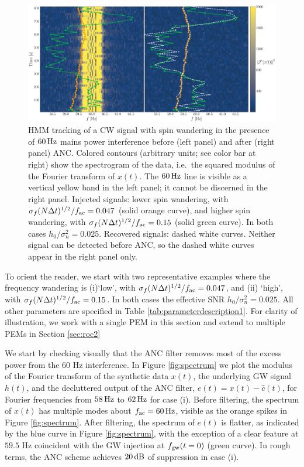 \documentclass[pra,superscriptaddress,reprint,amsmath,amssymb,nofootinbib]{revtex4-2}
\begin{document}
\begin{figure}
	\begin{center}
			\includegraphics[width=\textwidth]{images/viterbi_tracking_canonical}
		\end{center}
	\caption{\label{frequency tracking before and after1}
			HMM tracking of a CW signal with spin wandering in the presence of $60 \, {\rm Hz}$ mains power interference before (left panel) and after (right panel) ANC. Colored contours (arbitrary units; see color bar at right) show the spectrogram of the data, i.e.\ the squared modulus of the Fourier transform of $x(t)$. The $60 \, {\rm Hz}$ line is visible as a vertical yellow band in the left panel; it cannot be discerned in the right panel. Injected signals: lower spin wandering, with $\sigma_f (N \Delta t)^{1/2} / f_{\rm ac} = 0.047$ (solid orange curve), and higher spin wandering, with $\sigma_f (N \Delta t)^{1/2} / f_{\rm ac} = 0.15$ (solid green curve). In both cases $h_0 / \sigma_n^2 = 0.025$. Recovered signals: dashed white curves. Neither signal can be detected before ANC, so the dashed white curves appear in the right panel only.}
\end{figure}
To orient the reader, we start with two representative examples where the frequency wandering is  (i)`low', with $\sigma_f (N \Delta t)^{1/2} / f_{\rm ac} = 0.047$, and (ii) `high', with $\sigma_f (N \Delta t)^{1/2} / f_{\rm ac} = 0.15$. In both cases the effective SNR $h_0 / \sigma_n ^2= 0.025$. All other parameters are specified in Table \ref{tab:parameterdescription1}. For clarity of illustration, we work with a single PEM in this section and extend to multiple PEMs in Section \ref{sec:roc2} \newline 


We start by checking visually that the ANC filter removes most of the excess power from the 60 Hz interference. In Figure \ref{fig:spectrum} we plot the modulus of the Fourier transform of the synthetic data $x(t)$, the underlying GW signal $h(t)$, and the decluttered output of the ANC filter, $e(t) = x(t) - \hat{c}(t)$, for Fourier frequencies from $58 \, {\rm Hz}$ to $62 \, {\rm Hz}$ for case (i). Before filtering, the spectrum of $x(t)$ has multiple modes about $f_{\rm ac} = 60 \, {\rm Hz}$, visible as the orange spikes in Figure \ref{fig:spectrum}. After filtering, the spectrum of $e(t)$ is flatter, as indicated by the blue curve in Figure \ref{fig:spectrum}, with the exception of a clear feature at $59.5$ Hz coincident with the GW injection at $f_{\rm gw}(t=0)$ (green curve). In rough terms, the ANC scheme achieves $20 \, {\rm dB}$ of suppression in case (i).  \newline 
 
\end{document}
